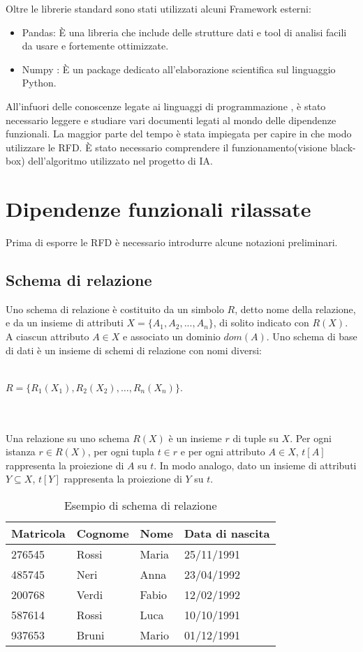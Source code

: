 Oltre le librerie standard sono stati utilizzati alcuni Framework esterni: 
\begin{itemize}
\item Pandas: È una libreria che include delle strutture dati e tool di analisi facili da usare e fortemente ottimizzate. 
\item Numpy : È un package dedicato all'elaborazione scientifica sul linguaggio Python.
\end{itemize}
All'infuori delle conoscenze legate ai linguaggi di programmazione , è stato necessario leggere e studiare vari documenti legati al mondo delle dipendenze funzionali. La maggior parte del tempo è stata impiegata per capire in che modo utilizzare le RFD. 
È stato necessario comprendere il funzionamento(visione black-box) dell’algoritmo utilizzato nel progetto di IA. 

\section{Dipendenze funzionali rilassate}
Prima di esporre le RFD è necessario introdurre alcune notazioni preliminari.

\subsection{Schema di relazione}
Uno schema di relazione è costituito da un simbolo $R$, detto nome della relazione, e da un insieme di attributi $X = \{A_1,A_2,...,A_n\}$, di solito indicato
con $R(X)$. A ciascun attributo $A \in X$ e associato un dominio $dom(A)$.
Uno schema di base di dati è un insieme di schemi di relazione con nomi
diversi:
\\~\\
\centerline{$R = \{ R_1(X_1),R_2(X_2),\ldots,R_n(X_n)\}$.}
\\~\\
Una relazione su uno schema $R(X)$ è un insieme $r$ di tuple su $X$. Per
ogni istanza $r \in R(X)$, per ogni tupla $t \in r$ e per ogni attributo $A \in X$,
$t[A]$ rappresenta la proiezione di $A$ su $t$. In modo analogo, dato un insieme
di attributi $Y \subseteq X$, $t[Y]$ rappresenta la proiezione di $Y$ su $t$.\cite{libroCeri}


\begin{table}[H]
    \centering
    \begin{tabular}{ | l | l | l | l |}
        \hline
        Matricola & Cognome & Nome & Data di nascita\\
        \hline
        276545 & Rossi & Maria & 25/11/1991 \\ 
        485745 & Neri & Anna & 23/04/1992 \\ 
        200768 & Verdi & Fabio & 12/02/1992 \\
        587614 & Rossi & Luca & 10/10/1991 \\
        937653 & Bruni & Mario & 01/12/1991 \\
        \hline
    \end{tabular}
    \caption{Esempio di schema di relazione}
    \label{tab:table example}
\end{table}


